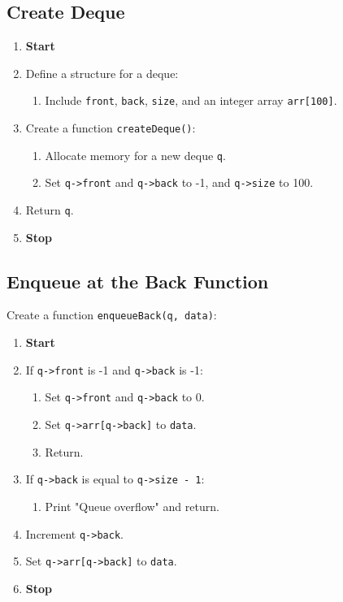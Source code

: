  {\selectfont

  \subsection{Create Deque}
  \begin{enumerate}[label=\arabic*:,left=0pt]
    \item \textbf{Start}
    \item Define a structure for a deque:
          \begin{enumerate}[label=2.\arabic*.]
            \item Include \texttt{front}, \texttt{back}, \texttt{size}, and an integer array \texttt{arr[100]}.
          \end{enumerate}
    \item Create a function \texttt{createDeque()}:
          \begin{enumerate}[label=3.\arabic*.]
            \item Allocate memory for a new deque \texttt{q}.
            \item Set \texttt{q->front} and \texttt{q->back} to -1, and \texttt{q->size} to 100.
          \end{enumerate}
    \item Return \texttt{q}.
    \item \textbf{Stop}
  \end{enumerate}

  \subsection{Enqueue at the Back Function}
  Create a function \texttt{enqueueBack(q, data)}:
  \begin{enumerate}[label=\arabic*:,left=0pt]
    \item \textbf{Start}
    \item If \texttt{q->front} is -1 and \texttt{q->back} is -1:
          \begin{enumerate}[label=2.\arabic*.]
            \item Set \texttt{q->front} and \texttt{q->back} to 0.
            \item Set \texttt{q->arr[q->back]} to \texttt{data}.
            \item Return.
          \end{enumerate}
    \item If \texttt{q->back} is equal to \texttt{q->size - 1}:
          \begin{enumerate}[label=2.\arabic*.]
            \item Print "Queue overflow" and return.
          \end{enumerate}
    \item Increment \texttt{q->back}.
    \item Set \texttt{q->arr[q->back]} to \texttt{data}.
    \item \textbf{Stop}
  \end{enumerate}

}
